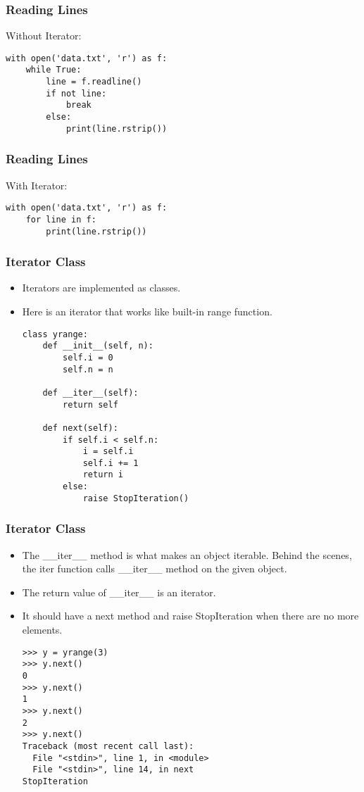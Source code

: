 \begin{frame}[fragile]\frametitle{Reading Lines}
Without Iterator:
\begin{lstlisting}
with open('data.txt', 'r') as f:
    while True:
        line = f.readline()
        if not line: 
            break
        else: 
            print(line.rstrip())
\end{lstlisting}

\end{frame}

\begin{frame}[fragile]\frametitle{Reading Lines}
With Iterator:
\begin{lstlisting}
with open('data.txt', 'r') as f:
    for line in f:
        print(line.rstrip())
\end{lstlisting}

\end{frame}


\begin{frame}[fragile]\frametitle{Iterator Class}
    \begin{itemize}
    \item Iterators are implemented as classes. 
    \item Here is an iterator that works like built-in range function.
	\begin{lstlisting}
class yrange:
    def __init__(self, n):
        self.i = 0
        self.n = n

    def __iter__(self):
        return self

    def next(self):
        if self.i < self.n:
            i = self.i
            self.i += 1
            return i
        else:
            raise StopIteration()
\end{lstlisting}
    \end{itemize}
\end{frame}

\begin{frame}[fragile]\frametitle{Iterator Class}
    \begin{itemize}
    \item The \_\_iter\_\_ method is what makes an object iterable. Behind the scenes, the iter function calls \_\_iter\_\_ method on the given object.
    \item The return value of \_\_iter\_\_ is an iterator.
    \item It should have a next method and raise StopIteration when there are no more elements.
	\begin{lstlisting}
>>> y = yrange(3)
>>> y.next()
0
>>> y.next()
1
>>> y.next()
2
>>> y.next()
Traceback (most recent call last):
  File "<stdin>", line 1, in <module>
  File "<stdin>", line 14, in next
StopIteration
\end{lstlisting}
    \end{itemize}
\end{frame}


